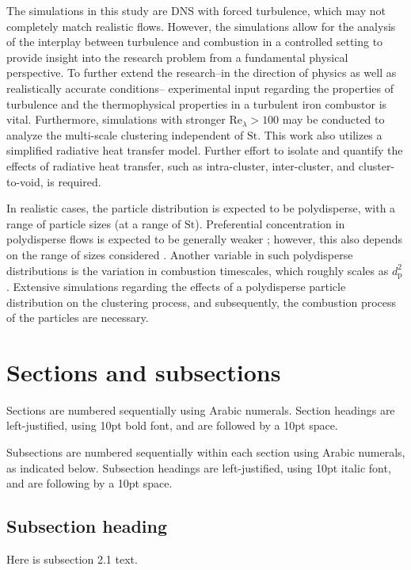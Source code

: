 \documentclass[times,twocolumn,final]{elsarticle}
\newcommand{\mrm}[1]{\mathrm{#1}}
\newcommand{\St}{\mathrm{St}}
\newcommand{\Rel}{\mathrm{Re}_\lambda}
\newcommand{\green}{\color{ForestGreen}}
\newcommand{\green}{}
\newcommand{\redd}{\color{red}}
\newcommand{\redd}{}
\begin{document}
The simulations in this study are DNS with forced turbulence, which may not completely match realistic flows. However, the simulations allow for the analysis of the interplay between turbulence and combustion in a controlled setting to provide insight into the research problem from a fundamental physical perspective. To further extend the research--in the direction of physics as well as realistically accurate conditions-- experimental input regarding the properties of turbulence and the thermophysical properties in a turbulent iron combustor is vital. Furthermore, simulations with stronger $\Rel > 100$ may be conducted to analyze the multi-scale clustering independent of $\mrm{St}$. {\redd This work also utilizes a simplified radiative heat transfer model. Further effort to isolate and quantify the effects of radiative heat transfer, such as intra-cluster, inter-cluster, and cluster-to-void, is required.} 

{\green In realistic cases, the particle distribution is expected to be polydisperse, with a range of particle sizes (at a range of $\St$). Preferential concentration in polydisperse flows is expected to be generally weaker \cite{Aliseda}; however, this also depends on the range of sizes considered \cite{Sumbekova}. Another variable in such polydisperse distributions is the variation in combustion timescales, which roughly scales as $d_\mrm{p}^2$ \cite{hemamalini2025}. Extensive simulations regarding the effects of a polydisperse particle distribution on the clustering process, and subsequently, the combustion process of the particles are necessary. }

\iffalse
\section{Sections and subsections}

Sections are numbered sequentially using Arabic numerals. Section
headings are left-justified, using 10pt bold font, and are followed by
a 10pt space.

Subsections are numbered sequentially within each section using Arabic
numerals, as indicated below. Subsection headings are left-justified,
using 10pt italic font, and are following by a 10pt space.

\subsection{Subsection heading}

Here is subsection 2.1 text.
\end{document}
